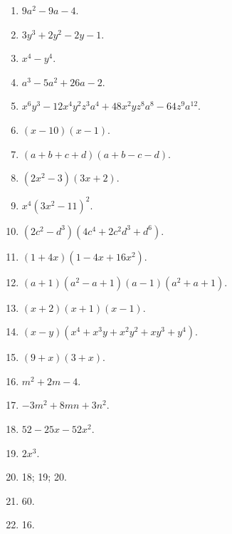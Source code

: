 \documentclass{book}
\begin{document}
\begin{enumerate}

\item $9a^2 - 9a - 4$.

\item $3y^3 + 2y^2 - 2y - 1$.

\item $x^4 - y^4$.

\item $a^3 - 5a^2 + 26a - 2$.

\item $x^6y^3 - 12x^4y^2z^3a^4 + 48x^2yz^8a^8 - 64z^9a^{12}$.

\item $\left(x-10\right)\left(x-1\right)$.

\item $\left(a + b + c + d\right)\left(a + b - c - d\right)$.

\item $\left(2x^2 - 3\right)\left(3x + 2\right)$.

\item $x^4\left(3x^2 - 11\right)^2$.

\item $\left(2c^2 - d^3\right)\left(4c^4 + 2c^2d^3 + d^6\right)$.

\item $\left(1 + 4x\right)\left(1 - 4x + 16x^2\right)$.

\item $\left(a+1\right)\left(a^2 - a + 1\right)
\left(a - 1\right)\left(a^2 + a + 1\right)$.

\item $\left(x+2\right)\left(x+1\right)\left(x-1\right)$.

\item $\left(x-y\right)\left(x^4 + x^3y + x^2y^2 + xy^3 + y^4\right)$.

\item $\left(9+x\right)\left(3+x\right)$.

\item $m^2 + 2m - 4$.

\item $-3m^2 + 8mn + 3n^2$.

\item $52 - 25x - 52x^2$.

\item $2x^3$.

\item 18; 19; 20.

\item 60.

\item 16.
\end{enumerate}
\end{document}
